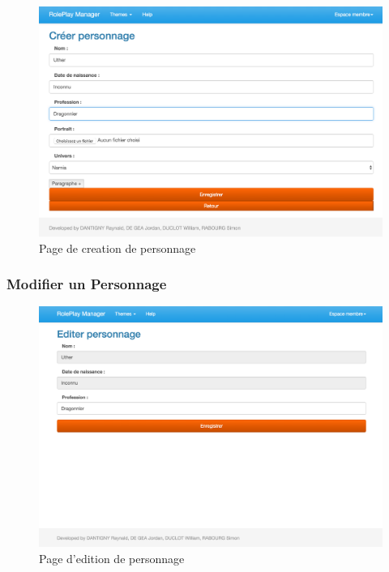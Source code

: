 \documentclass[a4paper,oneside,10pt]{article}
\begin{document}
\begin{figure}[H]
	\begin{center}
		\includegraphics[width=\textwidth]{images/manuel/creerpersonnage.png}  
		\caption{Page de creation de personnage}
	\end{center}
\end{figure}

\subsubsection{Modifier un Personnage}
\label{MUModifierPersonnage}

\begin{figure}[H]
	\begin{center}
		\includegraphics[width=\textwidth]{images/manuel/editerpersonnage.png}  
		\caption{Page d'edition de personnage}
	\end{center}
\end{figure}
\end{document}
